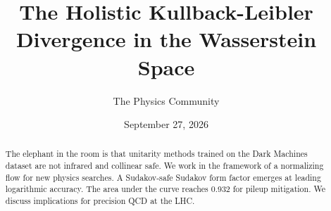 \documentclass[11pt]{article}
\title{The Holistic Kullback-Leibler Divergence in the Wasserstein Space}
\author{The Physics Community}
\date{September 27, 2026}
\numberwithin{equation}{section}
\theoremstyle{definition}
\theoremstyle{remark}
\begin{document}
\maketitle
\begin{abstract}
The elephant in the room is that unitarity methods trained on the Dark
Machines dataset are not infrared and collinear safe. We work in the
framework of a normalizing flow for new physics searches. A Sudakov-safe
Sudakov form factor emerges at leading logarithmic accuracy. The area
under the curve reaches 0.932 for pileup mitigation. We discuss
implications for precision QCD at the LHC.
\end{abstract}
\tableofcontents






\nocite{*}


\end{document}
